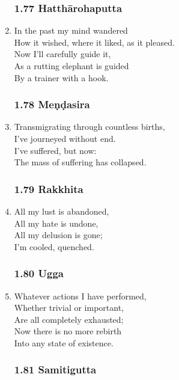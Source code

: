 \documentclass[10pt, openany]{book}
\begin{document}
\begin{enumerate}
\subsubsection*{1.77 Hatthārohaputta}

\item In the past my mind wandered\\
How it wished, where it liked, as it pleased.\\
Now I’ll carefully guide it,\\
As a rutting elephant is guided \\
By a trainer with a hook.

\subsubsection*{1.78 Meṇḍasira}

\item Transmigrating through countless births,\\
I’ve journeyed without end.\\
I’ve suffered, but now:\\
The mass of suffering has collapsed.

\subsubsection*{1.79 Rakkhita}

\item All my lust is abandoned,\\
All my hate is undone,\\
All my delusion is gone;\\
I’m cooled, quenched.

\subsubsection*{1.80 Ugga}

\item Whatever actions I have performed,\\
Whether trivial or important,\\
Are all completely exhausted;\\
Now there is no more rebirth \\
Into any state of existence.

\subsubsection*{1.81 Samitigutta}


\end{enumerate}
\end{document}
